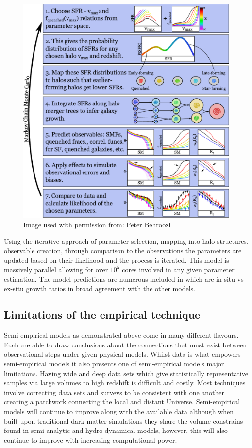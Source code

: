 \begin{figure}[h]
    \centering
    \includegraphics[width = \linewidth]{Figures/Chapter1/sfr_method.pdf}
    \caption{Image used with permission from: Peter Behroozi \cite{Behroozi2019UniverseMachine:010}}
    \label{fig:BehMeth}
\end{figure}


Using the iterative approach of parameter selection, mapping into halo structures, observable creation, through comparison to the observations the parameters are updated based on their likelihood and the process is iterated. This model is massively parallel allowing for over $10^{5}$ cores involved in any given parameter estimation. The model predictions are numerous included in which are in-situ vs ex-situ growth ratios in broad agreement with the other models.

\subsection{Limitations of the empirical technique}
Semi-empirical models as demonstrated above come in many different flavours. Each are able to draw conclusions about the connections that must exist between observational steps under given physical models. Whilst data is what empowers semi-empirical models it also presents one of semi-empirical models major limitations. Having wide and deep data sets which give statistically representative samples via large volumes to high redshift is difficult and costly. Most techniques involve correcting data sets and surveys to be consistent with one another creating a patchwork connecting the local and distant Universe. Semi-empirical models will continue to improve along with the available data although when built upon traditional dark matter simulations they share the volume constrains found in semi-analytic and hydro-dynamical models, however, this will also continue to improve with increasing computational power.


